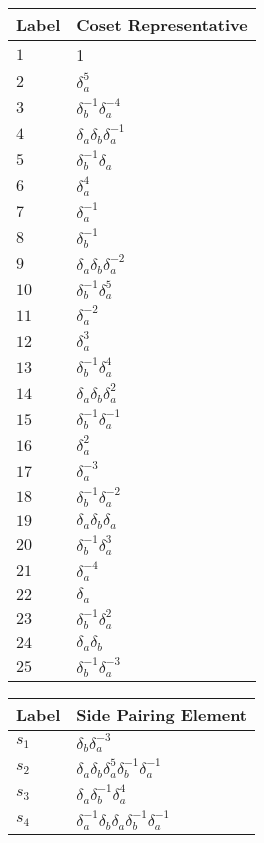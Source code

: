 \documentclass{article}
\begin{document}

\begin{center}
\begin{tabular}{ll}
\toprule
Label & Coset Representative\\
\midrule
$1$ & 1 \\
$2$ & $\delta_a^{5}$ \\
$3$ & $\delta_b^{-1}\delta_a^{-4}$ \\
$4$ & $\delta_a^{}\delta_b^{}\delta_a^{-1}$ \\
$5$ & $\delta_b^{-1}\delta_a^{}$ \\
$6$ & $\delta_a^{4}$ \\
$7$ & $\delta_a^{-1}$ \\
$8$ & $\delta_b^{-1}$ \\
$9$ & $\delta_a^{}\delta_b^{}\delta_a^{-2}$ \\
$10$ & $\delta_b^{-1}\delta_a^{5}$ \\
$11$ & $\delta_a^{-2}$ \\
$12$ & $\delta_a^{3}$ \\
$13$ & $\delta_b^{-1}\delta_a^{4}$ \\
$14$ & $\delta_a^{}\delta_b^{}\delta_a^{2}$ \\
$15$ & $\delta_b^{-1}\delta_a^{-1}$ \\
$16$ & $\delta_a^{2}$ \\
$17$ & $\delta_a^{-3}$ \\
$18$ & $\delta_b^{-1}\delta_a^{-2}$ \\
$19$ & $\delta_a^{}\delta_b^{}\delta_a^{}$ \\
$20$ & $\delta_b^{-1}\delta_a^{3}$ \\
$21$ & $\delta_a^{-4}$ \\
$22$ & $\delta_a^{}$ \\
$23$ & $\delta_b^{-1}\delta_a^{2}$ \\
$24$ & $\delta_a^{}\delta_b^{}$ \\
$25$ & $\delta_b^{-1}\delta_a^{-3}$ \\
\bottomrule
\end{tabular}
\hfill
\begin{tabular}{ll}
\toprule
Label & Side Pairing Element\\
\midrule
$s_{1}$ & $\delta_b^{}\delta_a^{-3}$ \\
$s_{2}$ & $\delta_a^{}\delta_b^{}\delta_a^{5}\delta_b^{-1}\delta_a^{-1}$ \\
$s_{3}$ & $\delta_a^{}\delta_b^{-1}\delta_a^{4}$ \\
$s_{4}$ & $\delta_a^{-1}\delta_b^{}\delta_a^{}\delta_b^{-1}\delta_a^{-1}$ \\

\end{tabular}
\end{center}
\end{document}
